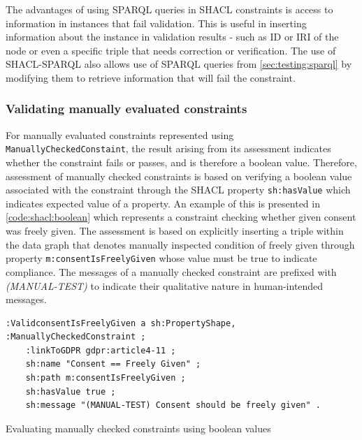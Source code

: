 The advantages of using SPARQL queries in SHACL constraints is access to information in instances that fail validation. This is useful in inserting information about the instance in validation results - such as ID or IRI of the node or even a specific triple that needs correction or verification.
The use of SHACL-SPARQL also allows use of SPARQL queries from \autoref{sec:testing:sparql} by modifying them to retrieve information that will fail the constraint.

\subsubsection{Validating manually evaluated constraints}
For manually evaluated constraints represented using \texttt{ManuallyCheckedConstaint}, the result arising from its assessment indicates whether the constraint fails or passes, and is therefore a boolean value.
Therefore, assessment of manually checked constraints is based on verifying a boolean value associated with the constraint through the SHACL property \texttt{sh:hasValue} which indicates expected value of a property.
An example of this is presented in \autoref{code:shacl:boolean} which represents a constraint checking whether given consent was freely given.
The assessment is based on explicitly inserting a triple within the data graph that denotes manually inspected condition of freely given through property \texttt{m:consentIsFreelyGiven} whose value must be true to indicate compliance.
The messages of a manually checked constraint are prefixed with \textit{(MANUAL-TEST)} to indicate their qualitative nature in human-intended messages.
\begin{listing}[htbp]
\begin{verbatim}
:ValidconsentIsFreelyGiven a sh:PropertyShape, :ManuallyCheckedConstraint ;
    :linkToGDPR gdpr:article4-11 ;
    sh:name "Consent == Freely Given" ;
    sh:path m:consentIsFreelyGiven ;
    sh:hasValue true ;
    sh:message "(MANUAL-TEST) Consent should be freely given" .
\end{verbatim}
\caption{Evaluating manually checked constraints using boolean values}
\label{code:shacl:boolean}
\end{listing}


